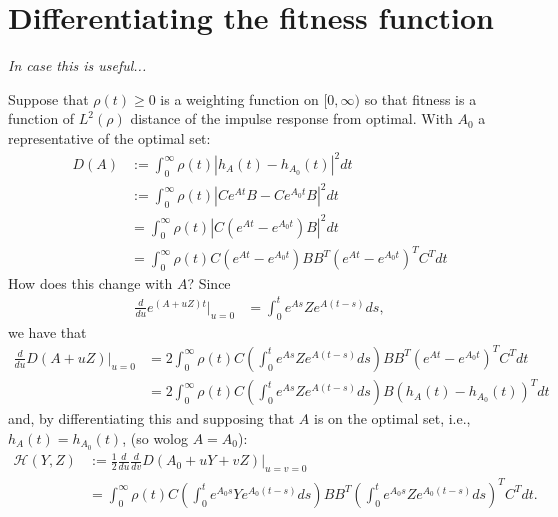 \documentclass[9 pt]{article}
\newcommand{\plr}[1]{{\color{blue}\it #1}}
\newcommand{\calH}{\mathcal{H}}
\newcommand{\1}{\mathbbm{1}}
\begin{document}
\section{Differentiating the fitness function}

\plr{In case this is useful...}

Suppose that $\rho(t) \ge 0$ is a weighting function on $[0,\infty)$
so that fitness is a function of $L^2(\rho)$ distance of the impulse response from optimal.
With $A_0$ a representative of the optimal set:
\begin{equation}
    \begin{aligned}
        D(A) 
        &:= 
        \int_0^\infty \rho(t) \left| h_A(t) - h_{A_0}(t) \right|^2 dt \\
        &:= 
        \int_0^\infty \rho(t) \left| C e^{At} B - C e^{A_0 t} B \right|^2 dt \\
        &= 
        \int_0^\infty \rho(t) \left| C \left( e^{At} - e^{A_0 t} \right) B \right|^2 dt \\
        &= 
        \int_0^\infty \rho(t) C \left( e^{At} - e^{A_0 t} \right) B B^T \left( e^{At} - e^{A_0 t} \right)^T C^T dt
    \end{aligned}
\end{equation}
How does this change with $A$?
Since
\begin{equation}
  \begin{aligned}
      \frac{d}{du} e^{(A+uZ)t} \vert_{u=0}
      &=
      \int_0^t e^{As} Z e^{A(t-s)} ds, 
  \end{aligned}
\end{equation}
we have that
\begin{equation}
  \begin{aligned}
      \frac{d}{du} D(A+uZ)\vert_{u=0}
      &=
        2 \int_0^\infty \rho(t) C \left( \int_0^t e^{As} Z e^{A(t-s)} ds \right) B B^T \left( e^{At} - e^{A_0 t} \right)^T C^T dt \\
      &=
        2 \int_0^\infty \rho(t) C \left( \int_0^t e^{As} Z e^{A(t-s)} ds \right) B \left( h_A(t) - h_{A_0}(t) \right)^T dt 
  \end{aligned}
\end{equation}
and, by differentiating this and supposing that $A$ is on the optimal set,
i.e., $h_A(t)=h_{A_0}(t)$, (so wolog $A=A_0$):
\begin{equation}
  \begin{aligned}
      \calH(Y,Z) &:= \frac{1}{2} \frac{d}{du} \frac{d}{dv} D(A_0+uY+vZ)\vert_{u=v=0} \\
      &=
        \int_0^\infty \rho(t) C 
        \left( \int_0^t e^{A_0 s} Y e^{A_0 (t-s)} ds \right) 
        B B^T 
        \left( \int_0^t e^{A_0 s} Z e^{A_0 (t-s)} ds \right)^T
        C^T dt  .
  \end{aligned}
\end{equation}
\end{document}
